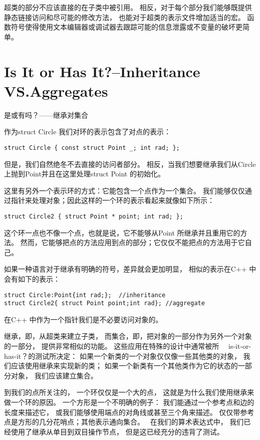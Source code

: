 超类的部分不应该直接的在子类中被引用。
相反，对于每个部分我们能够既提供静态链接访问和尽可能的修改方法，
也能对于超类的表示文件增加适当的宏。
函数符号使得使用文本编辑器或调试器去跟踪可能的信息泄露或不变量的破坏更简单。

\section{Is It or Has It?--Inheritance VS.Aggregates}
是或有吗？——继承对集合

作为struct Circle 我们对环的表示包含了对点的表示：
\begin{lstlisting}
struct Circle { const struct Point _; int rad; };
\end{lstlisting}

但是，我们自然绝冬不去直接的访问者部分。
相反，当我们想要继承我们从Circle 上抛到Point并且在这里处理struct Point 的初始化。

这里有另外一个表示环的方式：它能包含一个点作为一个集合。
我们能够仅仅通过指针来处理对象；因此这样的一个环的表示看起来就像如下所示：
\begin{lstlisting}
struct Circle2 { struct Point * point; int rad; };
\end{lstlisting}

这个环一点也不像一个点，也就是说，它不能够从Point 所继承并且重用它的方法。
然而，它能够把点的方法应用到点的部分；它仅仅不能把点的方法用于它自己。

如果一种语言对于继承有明确的符号，差异就会更加明显，
相似的表示在C++ 中会有如下的表示：
\begin{lstlisting}
struct Circle:Point{int rad;};  //inheritance
struct Circle2{ struct Point point;int rad}; //aggregate
\end{lstlisting}
在C++ 中作为一个指针我们是不必要访问对象的。

继承，即，从超类来建立子类，
而集合，即，把对象的一部分作为另外一个对象的一部分，
提供非常相似的功能。
这些应用在特殊的设计中通常被所　
is-it-or-has-it？的测试所决定：
如果一个新类的一个对象仅仅像一些其他类的对象，
我们应该使用继承来实现新的类；
如果一个新类有一个其他类作为它的状态的一部分对象，
我们应该建立集合。

到我们的点所关注的，
一个环仅仅是一个大的点，
这就是为什么我们使用继承来做一个环的原因。
一个方形是一个不明确的例子：
我们能通过一个参考点和边的长度来描述它，
或我们能够使用端点的对角线或甚至三个角来描述。
仅仅带参考点是方形的几分花哨点；其他表示通向集合。　
在我们的算术表达式中，
我们已经使用了继承从单目到双目操作节点，
但是这已经充分的违背了测试。

